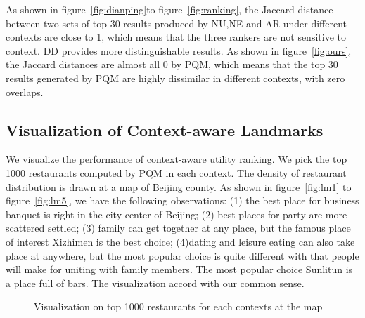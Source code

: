 \documentclass[preprint,12pt]{elsarticle}
\begin{document}
As shown in figure~\ref{fig:dianping}to figure~\ref{fig:ranking}, the Jaccard distance between two sets of top 30 results produced by NU,NE and AR under different contexts are close to 1, which means that the three rankers are not sensitive to context. DD provides more distinguishable results. As shown in figure~\ref{fig:ours}, the Jaccard distances are almost all 0 by PQM, which means that the top 30 results generated by PQM are highly dissimilar in different contexts, with zero overlaps.

\subsection{Visualization of Context-aware Landmarks}
We visualize the performance of context-aware utility ranking. We pick the top 1000 restaurants computed by PQM in each context. The density of restaurant distribution is drawn at a map of Beijing county. As shown in figure~\ref{fig:lm1} to figure~\ref{fig:lm5}, we have the following observations: (1) the best place for business banquet is right in the city center of Beijing; (2) best places for party are more scattered settled; (3) family can get together at any place, but the famous place of interest Xizhimen is the best choice; (4)dating and leisure eating can also take place at anywhere, but the most popular choice is quite different with that people will make for uniting with family members. The most popular choice Sunlitun is a place full of bars. The visualization accord with our common sense.
\begin{figure}
\centering
{}
\caption{Visualization on top 1000 restaurants for each contexts at the map}
\end{figure}
\end{document}

